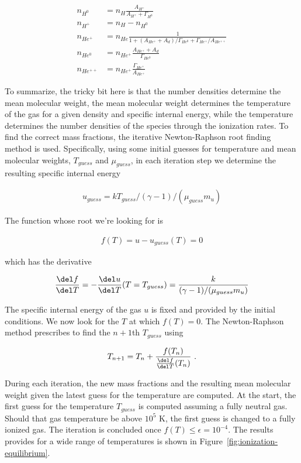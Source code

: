 \begin{align}
n_{H^0} &= n_H \frac{A_{H^+}}{A_{H^+} + \Gamma_{H^0}} \\
n_{H^+} &= n_H - n_{H^0} \\
n_{He^+} &= n_{He} \frac{1}{1 + (A_{He^+} + A_d) / \Gamma_{He^0} + \Gamma_{He^+} / A_{He^{++}}} \\
n_{He^0} &= n_{He^+} \frac{A_{He^+} + A_d}{\Gamma_{He^0}} \\
n_{He^{++}} &= n_{He^+} \frac{\Gamma_{He^+}}{A_{He^+}}
\end{align}

To summarize, the tricky bit here is that the number densities determine the mean molecular weight,
the mean molecular weight determines the temperature of the gas for a given density and specific
internal energy, while the temperature determines the number densities of the species through the
ionization rates. To find the correct mass fractions, the iterative Newton-Raphson root finding
method is used. Specifically, using some initial guesses for temperature and mean molecular
weights, $T_{guess}$ and $\mu_{guess}$, in each iteration step we determine the resulting specific
internal energy

\begin{align}
u_{guess} = k T_{guess} / (\gamma - 1) / (\mu_{guess} m_u)
\end{align}

The function whose root we're looking for is

\begin{align}
    f(T) = u - u_{guess}(T)  = 0
\end{align}

which has the derivative

\begin{align}
\frac{\del f}{\del T} =
    - \frac{\del u}{\del T} (T = T_{guess}) =
    \frac{k}{(\gamma - 1) / (\mu_{guess} m_u )}
\end{align}

The specific internal energy of the gas $u$ is fixed and provided by the initial conditions. We now
look for the $T$ at which $f(T) = 0$. The Newton-Raphson method prescribes to find the $n+1$th
$T_{guess}$ using

\begin{align}
    T_{n+1} = T_n + \frac{f(T_n)}{\frac{\del f}{\del T}(T_n)} \ .
\end{align}

During each iteration, the new mass fractions and the resulting mean molecular weight given the
latest guess for the temperature are computed. At the start, the first guess for the temperature
$T_{guess}$ is computed assuming a fully neutral gas. Should that gas temperature be above $10^5$
K, the first guess is changed to a fully ionized gas. The iteration is concluded once $f(T) \leq
\epsilon = 10^{-4}$. The results \GEARRT provides for a wide range of temperatures is shown in
Figure~\ref{fig:ionization-equilibrium}.



